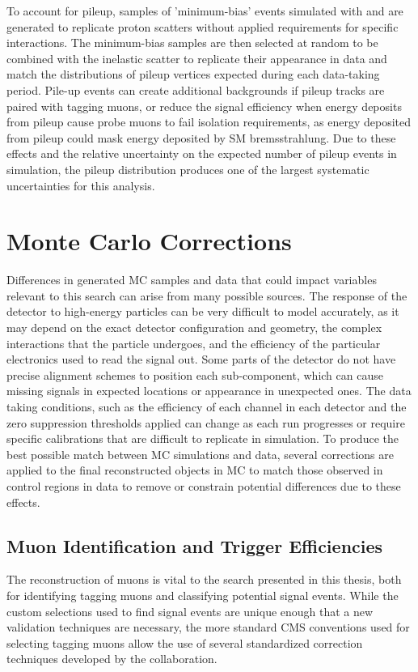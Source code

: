 To account for pileup, samples of 'minimum-bias' events simulated with \pythia and \geant are generated to replicate proton scatters without applied requirements for specific interactions.
The minimum-bias samples are then selected at random to be combined with the inelastic scatter to replicate their appearance in data and match the distributions of pileup vertices expected during each data-taking period.
Pile-up events can create additional backgrounds if pileup tracks are paired with tagging muons, or reduce the signal efficiency when energy deposits from pileup cause probe muons to fail isolation requirements, as energy deposited from pileup could mask energy deposited by SM bremsstrahlung.
Due to these effects and the relative uncertainty on the expected number of pileup events in simulation, the pileup distribution produces one of the largest systematic uncertainties for this analysis.

\section{Monte Carlo Corrections}
Differences in generated MC samples and data that could impact variables relevant to this search can arise from many possible sources.
The response of the detector to high-energy particles can be very difficult to model accurately, as it may depend on the exact detector configuration and geometry, the complex interactions that the particle undergoes, and the efficiency of the particular electronics used to read the signal out.
Some parts of the detector do not have precise alignment schemes to position each sub-component, which can cause missing signals in expected locations or appearance in unexpected ones. 
The data taking conditions, such as the efficiency of each channel in each detector and the zero suppression thresholds applied can change as each run progresses or require specific calibrations that are difficult to replicate in simulation.
To produce the best possible match between MC simulations and data, several corrections are applied to the final reconstructed objects in MC to match those observed in control regions in data to remove or constrain potential differences due to these effects.

\subsection{Muon Identification and Trigger Efficiencies}
The reconstruction of muons is vital to the search presented in this thesis, both for identifying tagging muons and classifying potential signal events.
While the custom selections used to find signal events are unique enough that a new validation techniques are necessary, the more standard CMS conventions used for selecting tagging muons allow the use of several standardized correction techniques developed by the collaboration.

